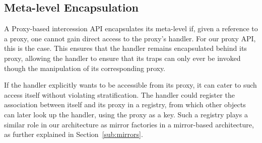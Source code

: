 \documentclass{sig-alternate}
\begin{document}

\subsection{Meta-level Encapsulation}
\label{sub:meta_level_encapsulation}

A Proxy-based intercession API encapsulates its meta-level if, given a reference to a proxy, one cannot gain direct access to the proxy's handler. For our proxy API, this is the case. This ensures that the handler remains encapsulated behind its proxy, allowing the handler to ensure that its traps can only ever be invoked though the manipulation of its corresponding proxy.

If the handler explicitly wants to be accessible from its proxy, it can cater to such access itself without violating stratification. The handler could register the association between itself and its proxy in a registry, from which other objects can later look up the handler, using the proxy as a key. Such a registry plays a similar role in our architecture as mirror factories in a mirror-based architecture, as further explained in Section~\ref{sub:mirrors}.




\end{document}
